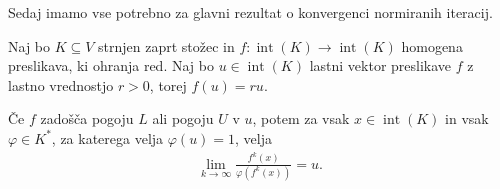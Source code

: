 \documentclass[mat2, tisk]{fmfdelo}
\begin{document}
Sedaj imamo vse potrebno za glavni rezultat o konvergenci normiranih
iteracij.

\begin{izrek}\label{izr:konvergenca_notranji_lastni_vektor}
  Naj bo $K\subseteq V$ strnjen zaprt stožec in
  $f:\operatorname{int}(K)\longrightarrow\operatorname{int}(K)$
  homogena preslikava, ki ohranja red. Naj bo
  $u\in\operatorname{int}(K)$ lastni vektor preslikave $f$ z lastno
  vrednostjo $r>0$, torej $f(u)=ru$.

  Če $f$ zadošča pogoju $L$ ali pogoju $U$ v $u$, potem za vsak
  $x\in\operatorname{int}(K)$ in vsak $\varphi\in K^*$, za katerega
  velja $\varphi(u)=1$, velja
  \begin{align*}
  \lim_{k\to\infty}
  \frac{f^k(x)}{\varphi(f^k(x))}
  =
  u.
  \end{align*}
\end{izrek}
\end{document}
